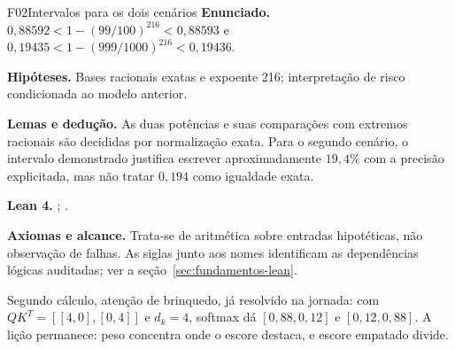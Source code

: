 \begin{formalizacao}{F02}{Intervalos para os dois cenários}
\textbf{Enunciado.} $0{,}88592<1-(99/100)^{216}<0{,}88593$ e $0{,}19435<1-(999/1000)^{216}<0{,}19436$.

\textbf{Hipóteses.} Bases racionais exatas e expoente 216; interpretação de risco condicionada ao modelo anterior.

\textbf{Lemas e dedução.} As duas potências e suas comparações com extremos racionais são decididas por normalização exata. Para o segundo cenário, o intervalo demonstrado justifica escrever aproximadamente $19{,}4\%$ com a precisão explicitada, mas não tratar $0{,}194$ como igualdade exata.

\textbf{Lean 4.} ; .

\textbf{Axiomas e alcance.} Trata-se de aritmética sobre entradas hipotéticas, não observação de falhas. As siglas junto aos nomes identificam as dependências lógicas auditadas; ver a seção~\ref{sec:fundamentos-lean}.
\end{formalizacao}


Segundo c\'alculo, aten\c{c}\~ao de brinquedo, j\'a resolvido na jornada: com $QK^{T}=[[4,0],[0,4]]$ e $d_{k}=4$, softmax d\'a $[0{,}88,0{,}12]$ e $[0{,}12,0{,}88]$. A li\c{c}\~ao permanece: peso concentra onde o escore destaca, e escore empatado divide.

